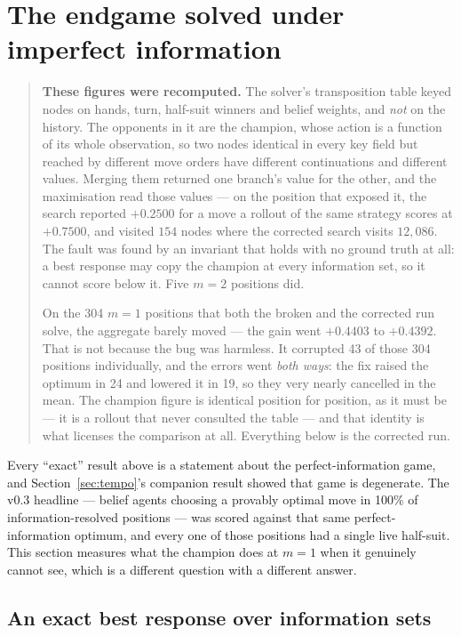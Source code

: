 \documentclass[11pt,a4paper]{article}
\begin{document}
\section{The endgame solved under imperfect information}
\label{sec:ii}

\begin{quote}
\textbf{These figures were recomputed.} The solver's transposition table keyed
nodes on hands, turn, half-suit winners and belief weights, and \emph{not} on
the history. The opponents in it are the champion, whose action is a function
of its whole observation, so two nodes identical in every key field but reached
by different move orders have different continuations and different values.
Merging them returned one branch's value for the other, and the maximisation
read those values --- on the position that exposed it, the search reported
$+0.2500$ for a move a rollout of the same strategy scores at $+0.7500$, and
visited $154$ nodes where the corrected search visits $12{,}086$. The fault was
found by an invariant that holds with no ground truth at all: a best response
may copy the champion at every information set, so it cannot score below it.
Five $m = 2$ positions did.

On the 304 $m = 1$ positions that both the broken and the corrected run solve,
the aggregate barely moved --- the gain went $+0.4403$ to $+0.4392$. That is not
because the bug was harmless. It corrupted 43 of those 304 positions
individually, and the errors went \emph{both ways}: the fix raised the optimum
in 24 and lowered it in 19, so they very nearly cancelled in the mean. The
champion figure is identical position for position, as it must be --- it is a
rollout that never consulted the table --- and that identity is what licenses
the comparison at all. Everything below is the corrected run.
\end{quote}

Every ``exact'' result above is a statement about the perfect-information game,
and Section~\ref{sec:tempo}'s companion result showed that game is degenerate.
The v0.3 headline --- belief agents choosing a provably optimal move in 100\%
of information-resolved positions --- was scored against that same
perfect-information optimum, and every one of those positions had a single live
half-suit. This section measures what the champion does at $m = 1$ when it
genuinely cannot see, which is a different question with a different answer.

\subsection{An exact best response over information sets}
\end{document}
